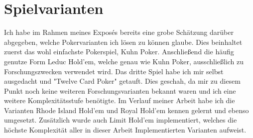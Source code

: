\section{Spielvarianten}
Ich habe im Rahmen meines Exposés bereits eine grobe Schätzung darüber abgegeben, welche Pokervarianten ich lösen zu können glaube.
Dies beinhaltet zuerst das wohl einfachste Pokerspiel, Kuhn Poker.
Anschließend die häufig genutze Form Leduc Hold'em, welche genau wie Kuhn Poker, ausschließlich zu Forschungszwecken verwendet wird. 
Das dritte Spiel habe ich mir selbst ausgedacht und "Twelve Card Poker" getauft. 
Dies geschah, da mir zu diesem Punkt noch keine weiteren Forschungsvarianten bekannt waren und ich eine weitere Komplexitätsstufe benötigte. 
Im Verlauf meiner Arbeit habe ich die Varianten Rhode Island Hold'em und Royal Hold'em kennen gelernt und ebenso umgesetzt.
Zusätzlich wurde auch Limit Hold'em implementiert, welches die höchste Komplexität aller in dieser Arbeit Implementierten Varianten aufweist.


